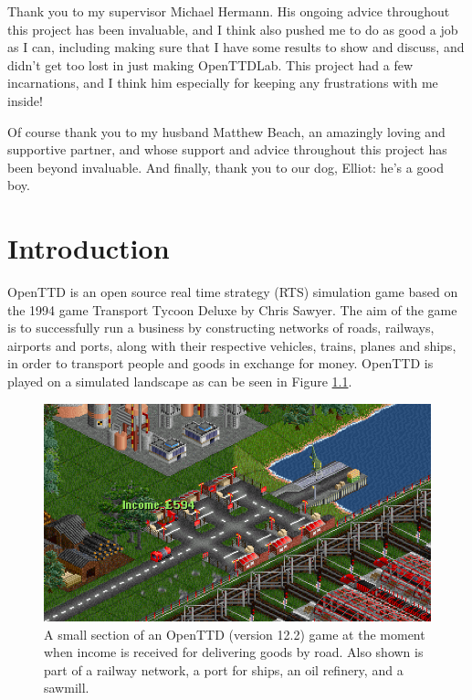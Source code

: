 \documentclass[logo,msc,dsti]{infthesis}    %
\begin{document}
\begin{preliminary}
\begin{acknowledgements}
Thank you to my supervisor Michael Hermann. His ongoing advice throughout this project has been invaluable, and I think also pushed me to do as good a job as I can, including making sure that I have some results to show and discuss, and didn't get too lost in just making OpenTTDLab. This project had a few incarnations, and I think him especially for keeping any frustrations with me inside!

Of course thank you to my husband Matthew Beach, an amazingly loving and supportive partner, and whose support and advice throughout this project has been beyond invaluable. And finally, thank you to our dog, Elliot: he's a good boy.

\end{acknowledgements}


\tableofcontents
\end{preliminary}


\chapter{Introduction}

OpenTTD \cite{openttd} is an open source real time strategy (RTS) simulation game based on the 1994 game Transport Tycoon Deluxe by Chris Sawyer. The aim of the game is to successfully run a business by constructing networks of roads, railways, airports and ports, along with their respective vehicles, trains, planes and ships, in order to transport people and goods in exchange for money. OpenTTD is played on a simulated landscape as can be seen in Figure \ref{fig:openttd}.

\begin{figure}[h]
\centering
\includegraphics[width=\columnwidth]{assets/openttd-screenshot.png}
\caption{A small section of an OpenTTD (version 12.2) game at the moment when income is received for delivering goods by road. Also shown is part of a railway network, a port for ships, an oil refinery, and a sawmill.}
\label{fig:openttd}
\end{figure}
\end{document}
